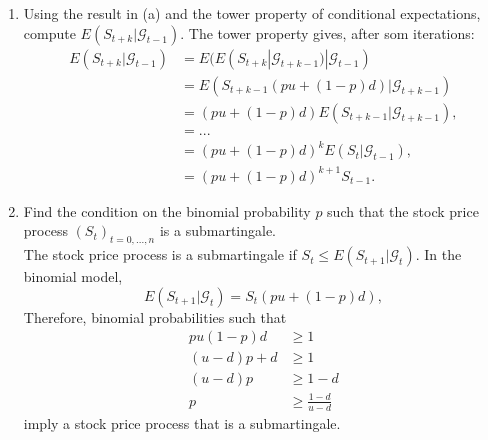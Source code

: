 \documentclass[11pt,a4,table]{article}
\begin{document}
\begin{enumerate}
\begin{enumerate}
        \item Using the result in (a) and the tower property of conditional expectations, compute $E(S_{t+k}|\mathcal{G}_{t-1})$.
        The tower property gives, after som iterations:
        \begin{align*}
            E(S_{t+k}|\mathcal{G}_{t-1} ) &= E(E(S_{t+k}|\mathcal{G}_{t+k-1}) | \mathcal{G}_{t-1}) \\
            &= E(S_{t+k-1}(pu+(1-p)d)|\mathcal{G}_{t+k-1}) \\
            &= (pu+(1-p)d)E(S_{t+k-1}|\mathcal{G}_{t+k-1}), \\
            &= ... \\
            &= (pu+(1-p)d)^k E(S_t|\mathcal{G}_{t-1}), \\
            &= (pu+(1-p)d)^{k+1}S_{t-1}.
        \end{align*}
        
        \item Find the condition on the binomial probability $p$ such that the stock price process $(S_t)_{t=0,...,n}$ is a submartingale.\\
        The stock price process is a submartingale if $S_t \leq E(S_{t+1}|\mathcal{G}_t)$. In the binomial model,
        \begin{equation*}
            E(S_{t+1}|\mathcal{G}_t) = S_t(pu+(1-p)d),
        \end{equation*}
        Therefore, binomial probabilities such that
        \begin{align*}
            pu(1-p)d &\geq 1\\
            (u-d)p+d &\geq 1\\
            (u-d)p &\geq 1-d\\
            p &\geq \frac{1-d}{u-d}
        \end{align*}
        imply a stock price process that is a submartingale.
        

\end{enumerate}
\end{enumerate}
\end{document}
